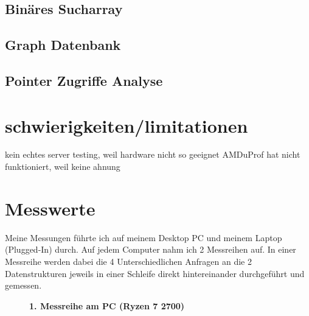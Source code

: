 \documentclass[11pt,a4paper]{article}
\begin{document}
\subsection{Binäres Sucharray}
\subsection{Graph Datenbank}

\subsection{Pointer Zugriffe Analyse}

\section{schwierigkeiten/limitationen}

kein echtes server testing, weil hardware nicht so geeignet
AMDuProf hat nicht funktioniert, weil keine ahnung

\section{Messwerte}

Meine Messungen führte ich auf meinem Desktop PC und meinem Laptop (Plugged-In) durch.
Auf jedem Computer nahm ich 2 Messreihen auf. In einer Messreihe werden dabei
die 4 Unterschiedlichen Anfragen an die 2 Datenstrukturen jeweils in einer Schleife direkt
hintereinander durchgeführt und gemessen.

\clearpage

\begin{figure}[H]
    \centering
    \vspace*{-0.8cm}
    \caption{\textbf{1. Messreihe am PC (Ryzen 7 2700)}}
\end{figure}
\end{document}

